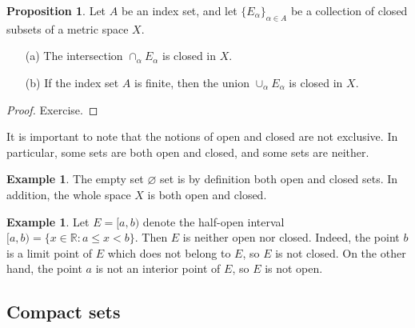 \documentclass[12pt]{article}
\theoremstyle{definition}
\newtheorem{example}[definition]{Example}
\theoremstyle{theorem}
\newtheorem{proposition}[definition]{Proposition}
\begin{document}
\begin{proposition}
Let $A$ be an index set, and let $\{E_\alpha\}_{\alpha \in A}$ be a collection of closed subsets of a metric space $X$. 
\begin{enumerate}
\item[(a)] The intersection $\cap_\alpha E_\alpha$ is closed in $X$. 
\item[(b)] If the index set $A$ is finite, then the union $\cup_\alpha E_\alpha$ is closed in $X$. 
\end{enumerate}
\end{proposition}

\begin{proof}
Exercise. 
\end{proof}

It is important to note that the notions of open and closed are not exclusive. In particular, some sets are both open and closed, and some sets are neither. 

\begin{example}
The empty set $\varnothing$ set is by definition both open and closed sets. In addition, the whole space $X$ is both open and closed. 
\end{example}

\begin{example}
Let $E = [a,b)$ denote the half-open interval $[a,b) = \{x \in \mathbb{R} : a \leqslant x < b\}$. Then $E$ is neither open nor closed. Indeed, the point $b$ is a limit point of $E$ which does not belong to $E$, so $E$ is not closed. On the other hand, the point $a$ is not an interior point of $E$, so $E$ is not open. 
\end{example}





\subsection{Compact sets}
\end{document}
